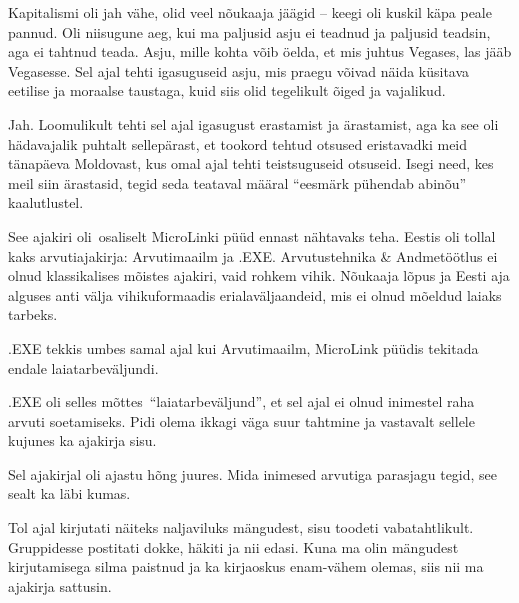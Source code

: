 
Kapitalismi oli jah vähe, olid veel nõukaaja jäägid -- keegi oli kuskil käpa peale 
pannud. Oli niisugune aeg, kui ma paljusid asju ei teadnud ja 
paljusid teadsin, aga ei tahtnud teada. Asju, mille kohta võib öelda, et mis juhtus Vegases, las jääb Vegasesse. Sel ajal tehti 
igasuguseid asju, mis praegu võivad näida küsitava 
eetilise ja moraalse taustaga, kuid siis olid 
tegelikult õiged ja vajalikud.


Jah. Loomulikult tehti sel ajal igasugust erastamist ja ärastamist, aga ka see oli 
hädavajalik puhtalt sellepärast, et tookord tehtud otsused eristavadki meid 
tänapäeva Moldovast, kus omal ajal tehti teistsuguseid otsuseid. Isegi 
need, kes meil siin ärastasid, tegid seda teataval määral 
\enquote{eesmärk pühendab abinõu} kaalutlustel.


See ajakiri oli osaliselt MicroLinki püüd ennast nähtavaks 
teha. Eestis oli tollal kaks arvutiajakirja: 
Arvutimaailm ja .EXE. Arvutustehnika \& 
Andmetöötlus ei olnud klassikalises mõistes ajakiri, vaid rohkem 
vihik. Nõukaaja lõpus ja Eesti aja alguses anti välja vihikuformaadis 
erialaväljaandeid, mis ei olnud mõeldud laiaks tarbeks.

.EXE tekkis umbes samal ajal kui Arvutimaailm, MicroLink 
püüdis tekitada endale laiatarbeväljundi.


.EXE oli selles mõttes \enquote{laiatarbeväljund}, et sel ajal ei olnud inimestel 
raha arvuti soetamiseks. Pidi olema ikkagi väga suur tahtmine ja vastavalt sellele kujunes ka ajakirja sisu. 

Sel ajakirjal oli ajastu hõng juures. Mida inimesed arvutiga parasjagu tegid, 
see sealt ka läbi kumas. 


Tol ajal kirjutati näiteks naljaviluks mängudest, sisu toodeti vabatahtlikult. 
Gruppidesse postitati dokke, häkiti ja nii edasi. Kuna ma olin mängudest kirjutamisega silma 
paistnud ja ka kirjaoskus enam-vähem olemas, siis nii ma ajakirja sattusin. 

